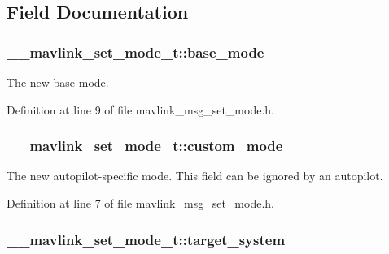 \subsection{Field Documentation}
\hypertarget{struct____mavlink__set__mode__t_a7a48085507fabce566221fb4ede8c8a6}{
\subsubsection[{base\-\_\-mode}]{ \-\_\-\-\_\-mavlink\-\_\-set\-\_\-mode\-\_\-t\-::base\-\_\-mode}}\label{struct____mavlink__set__mode__t_a7a48085507fabce566221fb4ede8c8a6}


The new base mode. 



Definition at line 9 of file mavlink\-\_\-msg\-\_\-set\-\_\-mode.\-h.

\hypertarget{struct____mavlink__set__mode__t_ab932915605e53ff1f42c57f3159b63f6}{
\subsubsection[{custom\-\_\-mode}]{ \-\_\-\-\_\-mavlink\-\_\-set\-\_\-mode\-\_\-t\-::custom\-\_\-mode}}\label{struct____mavlink__set__mode__t_ab932915605e53ff1f42c57f3159b63f6}


The new autopilot-\/specific mode. This field can be ignored by an autopilot. 



Definition at line 7 of file mavlink\-\_\-msg\-\_\-set\-\_\-mode.\-h.

\hypertarget{struct____mavlink__set__mode__t_a58cf8afdf2920c038cae4645c79ac372}{
\subsubsection[{target\-\_\-system}]{ \-\_\-\-\_\-mavlink\-\_\-set\-\_\-mode\-\_\-t\-::target\-\_\-system}}\label{struct____mavlink__set__mode__t_a58cf8afdf2920c038cae4645c79ac372}


